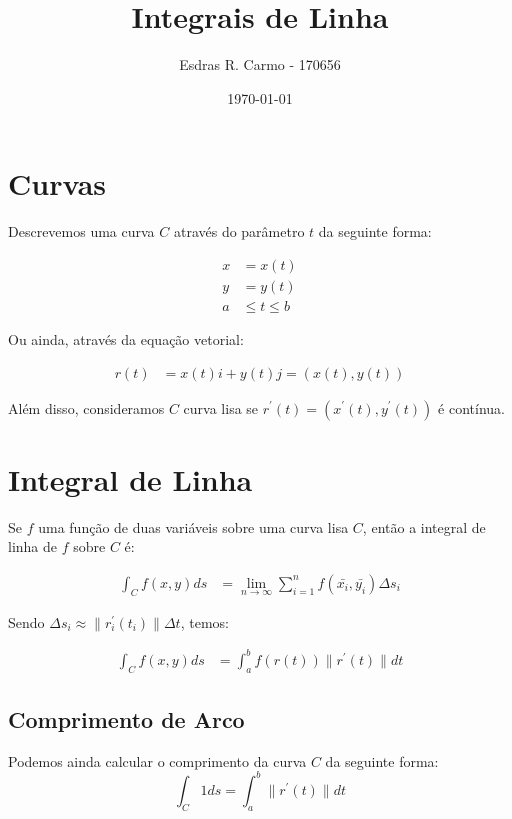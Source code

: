 \documentclass{article}
\author{Esdras R. Carmo - 170656}
\title{Integrais de Linha}
\date{\today}
\newcommand{\norm}[1] {\left.\parallel #1 \right.\parallel}
\begin{document}
    \maketitle

    \section{Curvas}
        Descrevemos uma curva $C$ através do parâmetro $t$ da seguinte forma:

        \begin{align*}
            x &= x(t)\\
            y &= y(t)\\
            a &\leq t \leq b
        \end{align*}

        Ou ainda, através da equação vetorial:

        \begin{align*}
            r(t) &= x(t)i + y(t)j = (x(t), y(t))
        \end{align*}

        Além disso, consideramos $C$ curva lisa se $r^\prime (t) = (x^\prime (t), y^\prime (t))$ é contínua.

    \section{Integral de Linha}
        Se $f$ uma função de duas variáveis sobre uma curva lisa $C$, então a integral de linha de $f$ sobre $C$ é:

        \begin{align*}
            \int_C f(x,y) ds &= \lim_{n \to \infty} \sum_{i = 1}^{n} f(\bar{x_i}, \bar{y_i}) \Delta s_i
        \end{align*}

        Sendo $\Delta s_i \approx \norm{r^\prime_i (t_i) } \Delta t$, temos:

        \begin{align*}
            \int_C f(x,y) ds &= \int_a^b f(r(t)) \norm{r^\prime(t)} dt
        \end{align*}

        \subsection{Comprimento de Arco}
            Podemos ainda calcular o comprimento da curva $C$ da seguinte forma:
            \[
                \int_C 1 ds = \int_a^b \norm{r^\prime(t)} dt
            \]
\end{document}
